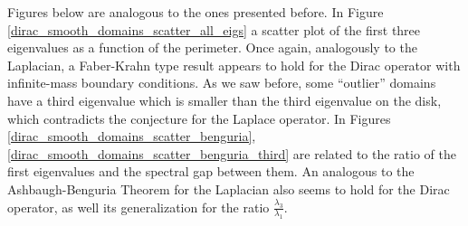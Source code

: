 Figures below are analogous to the ones presented before. In Figure \ref{dirac_smooth_domains_scatter_all_eigs} a scatter plot of the first three eigenvalues as a function of the perimeter. Once again, analogously to the Laplacian, a Faber-Krahn type result appears to hold for the Dirac operator with infinite-mass boundary conditions. As we saw before, some ``outlier'' domains have a third eigenvalue which is smaller than the third eigenvalue on the disk, which contradicts the conjecture for the Laplace operator.
In Figures \ref{dirac_smooth_domains_scatter_benguria}, \ref{dirac_smooth_domains_scatter_benguria_third} are related to the ratio of the first eigenvalues and the spectral gap between them. An analogous to the Ashbaugh-Benguria Theorem for the Laplacian also seems to hold for the Dirac operator, as well its generalization for the ratio \(\frac{\lambda_3}{\lambda_1}\).

